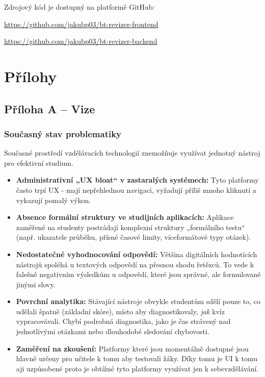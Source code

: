 \documentclass{vskpou} %
\begin{document}
Zdrojový kód je dostupný na platformě GitHub:

\url{https://github.com/jakubp03/bt-revizer-frontend}

\url{https://github.com/jakubp03/bt-revizer-backend}


\newpage
\renewcommand{\listfigurename}{Seznam obrázků}
\listoffigures

\newpage
\renewcommand{\listtablename}{Seznam tabulek}
\listoftables

\newpage
\printbibliography[title={Literatura}]

\setcounter{secnumdepth}{-1}
\section*{Přílohy}

\clearpage
\subsection{Příloha A -- Vize}

\subsubsection*{Současný stav problematiky}

Současné prostředí vzdělávacích technologií znemožňuje využívat jednotný nástroj pro efektivní studium. 

\begin{itemize}
    \item \textbf{Administrativní „UX bloat“ v zastaralých systémech:} Tyto platformy často trpí UX - mají nepřehlednou navigaci, vyžadují příliš mnoho kliknutí a vykazují pomalý výkon.
    \item \textbf{Absence formální struktury ve studijních aplikacích:} Aplikace zaměřené na studenty postrádají komplexní struktury „formálního testu“ (např. ukazatele průběhu, přísné časové limity, víceformátové typy otázek).
    \item \textbf{Nedostatečné vyhodnocování odpovědí:} Většina digitálních hodnotících nástrojů spoléhá u textových odpovědí na přesnou shodu řetězců. To vede k falešně negativním výsledkům u odpovědí, které jsou správné, ale formulované jinými slovy.
    \item \textbf{Povrchní analytika:} Stávající nástroje obvykle studentům sdělí pouze to, co udělali špatně (základní skóre), místo aby diagnostikovaly, \textit{jak} kvíz vypracovávali. Chybí podrobná diagnostika, jako je čas strávený nad jednotlivými otázkami nebo dlouhodobé sledování chybovosti.
    \item \textbf{Zaměření na zkoušení:} Platformy které jsou momentálně dostupné jsou hlavně určeny pro učitele k tomu aby testovali žáky. Díky tomu je UI k tomu aji uzpůsobené proto je obtížné tyto platformy využívat jen k sebevzdělávání.
\end{itemize}
\end{document}
